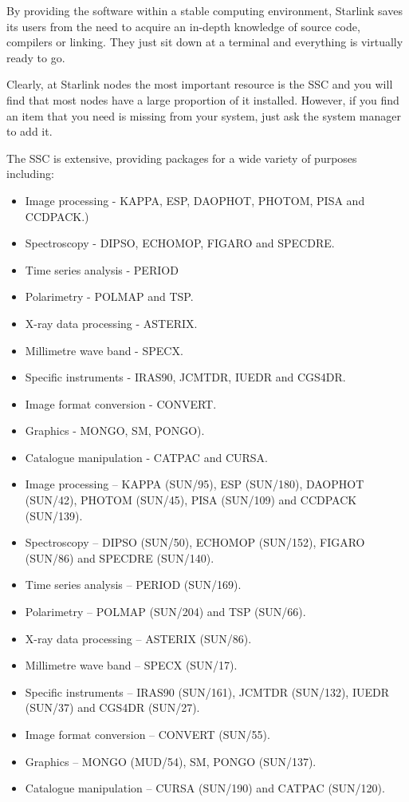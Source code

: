 \documentclass[twoside,11pt]{article}
\newenvironment{latexonly}{}{}
\newcommand{\xref}[3]{#1}
\newcommand{\CCDPACKref}{\xref{CCDPACK}{sun139}{}}
\newcommand{\ESPref}{\xref{ESP}{sun180}{}}
\newcommand{\FIGAROref}{\xref{FIGARO}{sun86}{}}
\newcommand{\KAPPAref}{\xref{KAPPA}{sun95}{}}
\newcommand{\DAOPHOTref}{\xref{DAOPHOT}{sun42}{}}
\newcommand{\PHOTOMref}{\xref{PHOTOM}{sun45}{}}
\newcommand{\PISAref}{\xref{PISA}{sun109}{}}
\newcommand{\DIPSOref}{\xref{DIPSO}{sun50}{}}
\newcommand{\ECHOMOPref}{\xref{ECHOMOP}{sun152}{}}
\newcommand{\SPECDREref}{\xref{SPECDRE}{sun140}{}}
\newcommand{\PERIODref}{\xref{PERIOD}{sun167}{}}
\newcommand{\POLMAPref}{\xref{POLMAP}{sun204}{}}
\newcommand{\TSPref}{\xref{TSP}{sun66}{}}
\newcommand{\CATPACref}{\xref{CATPAC}{sun120}{}}
\newcommand{\CURSAref}{\xref{CURSA}{sun190}{}}
\newcommand{\ASTERIXref}{\xref{ASTERIX}{sun98}{}}
\newcommand{\SPECXref}{\xref{SPECX}{sun17}{}}
\newcommand{\IRASref}{\xref{IRAS90}{sun161}{}}
\newcommand{\JCMTDRref}{\xref{JCMTDR}{sun132}{}}
\newcommand{\IUEDRref}{\xref{IUEDR}{sun37}{}}
\newcommand{\CGSDRref}{\xref{CGS4DR}{sun27}{}}
\newcommand{\CONVERTref}{\xref{CONVERT}{sun55}{}}
\newcommand{\PONGOref}{\xref{PONGO}{sun137}{}}
\begin{document}
By providing the software within a stable computing environment,
Starlink saves its users from the need to
acquire an in-depth knowledge of source code, compilers or linking. They
just sit down at a terminal and everything is virtually ready to go.

Clearly, at Starlink nodes the most important resource is the SSC
and you will find that most nodes have a large proportion of it installed.
However, if you find an item that you need is missing from your system,
just ask the system manager to add it.

The SSC is extensive, providing packages for a wide variety of purposes
including:

\begin{htmlonly}
\begin{itemize}
\item Image processing - {\KAPPAref}, {\ESPref}, {\DAOPHOTref}, {\PHOTOMref}, {\PISAref} and {\CCDPACKref}.)
\item Spectroscopy - {\DIPSOref}, {\ECHOMOPref}, {\FIGAROref} and
      {\SPECDREref}.
\item Time series analysis - {\PERIODref}
\item Polarimetry - {\POLMAPref} and {\TSPref}.
\item X-ray data processing - {\ASTERIXref}.
\item Millimetre wave band - {\SPECXref}.
\item Specific instruments - {\IRASref}, {\JCMTDRref}, {\IUEDRref} and {\CGSDRref}.
\item Image format conversion - {\CONVERTref}.
\item Graphics - MONGO, SM, {\PONGOref}).
\item Catalogue manipulation - {\CATPACref} and {\CURSAref}.
\end{itemize}
\end{htmlonly}
\begin{latexonly}
\begin{itemize}
\item Image processing -- KAPPA (SUN/95), ESP (SUN/180), DAOPHOT (SUN/42),
      PHOTOM (SUN/45), PISA (SUN/109) and CCDPACK (SUN/139).
\item Spectroscopy -- DIPSO (SUN/50), ECHOMOP (SUN/152), FIGARO (SUN/86) and SPECDRE (SUN/140).
\item Time series analysis -- PERIOD (SUN/169).
\item Polarimetry -- POLMAP (SUN/204) and TSP (SUN/66).
\item X-ray data processing -- ASTERIX (SUN/86).
\item Millimetre wave band -- SPECX (SUN/17).
\item Specific instruments -- IRAS90 (SUN/161), JCMTDR (SUN/132), IUEDR (SUN/37) and CGS4DR (SUN/27).
\item Image format conversion -- CONVERT (SUN/55).
\item Graphics -- MONGO (MUD/54), SM, PONGO (SUN/137).
\item Catalogue manipulation -- CURSA (SUN/190) and CATPAC (SUN/120).
\end{itemize}
\end{latexonly}
\end{document}
